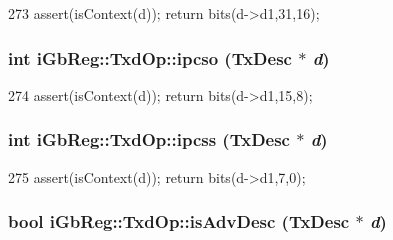 \begin{DoxyCode}
273 { assert(isContext(d)); return bits(d->d1,31,16); }
\end{DoxyCode}
\hypertarget{namespaceiGbReg_1_1TxdOp_ab7b81a0cb8761fae8af2a578e4b0bb05}{
\subsubsection[{ipcso}]{\setlength{\rightskip}{0pt plus 5cm}int iGbReg::TxdOp::ipcso (TxDesc $\ast$ {\em d})}}
\label{namespaceiGbReg_1_1TxdOp_ab7b81a0cb8761fae8af2a578e4b0bb05}



\begin{DoxyCode}
274 { assert(isContext(d)); return bits(d->d1,15,8); }
\end{DoxyCode}
\hypertarget{namespaceiGbReg_1_1TxdOp_a05698994ed2909120e188568af94c622}{
\subsubsection[{ipcss}]{\setlength{\rightskip}{0pt plus 5cm}int iGbReg::TxdOp::ipcss (TxDesc $\ast$ {\em d})}}
\label{namespaceiGbReg_1_1TxdOp_a05698994ed2909120e188568af94c622}



\begin{DoxyCode}
275 { assert(isContext(d)); return bits(d->d1,7,0); }
\end{DoxyCode}
\hypertarget{namespaceiGbReg_1_1TxdOp_a9ba8413e17f0e3e37b80982bf38e1bf1}{
\subsubsection[{isAdvDesc}]{\setlength{\rightskip}{0pt plus 5cm}bool iGbReg::TxdOp::isAdvDesc (TxDesc $\ast$ {\em d})}}
\label{namespaceiGbReg_1_1TxdOp_a9ba8413e17f0e3e37b80982bf38e1bf1}



